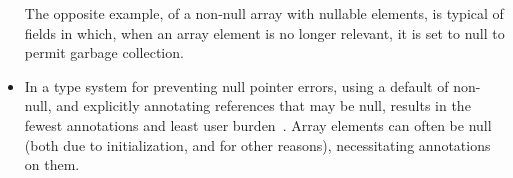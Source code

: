 \documentclass[10pt]{article}
\begin{document}
\begin{itemize}



  The opposite example, of a non-null array with nullable elements, is
  typical of fields in which, when an array element is no longer
  relevant, it is set to null to permit garbage collection.

\item
  In a type system for preventing null pointer errors, using a default of
  non-null, and explicitly annotating references that may be null, results
  in the fewest annotations and least user
  burden~\cite{FahndrichL2003,ChalinJ2007,PapiACPE2008}.  Array elements
  can often be null (both due to initialization, and for other reasons),
  necessitating annotations on them.
\end{itemize}
\end{document}

